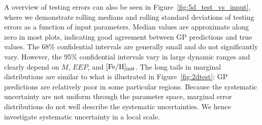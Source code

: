 A overview of testing errors can also be seen in Figure~\ref{fig:5d_test_vs_input}, where we demonstrate rolling medians and rolling standard deviations of testing errors as a function of input parameters.
%
Median values are approximate along zero in most plots, indicating good agreement between GP predictions and true values.
%
The 68\% confidential intervals are generally small and do not significantly vary. However, the 95\% confidential intervals vary in large dynamic ranges and clearly depend on $M$, $EEP$, and $\rm [Fe/H]_{init}$. The long tails in marginal distributions are similar to what is illustrated in Figure~\ref{fig:2dtest}: GP predictions are relatively poor in some particular regions. Because the systematic uncertainty are not uniform through the parameter space, marginal error distributions do not well describe the systematic uncertainties. We hence investigate systematic uncertainty in a local scale. 

